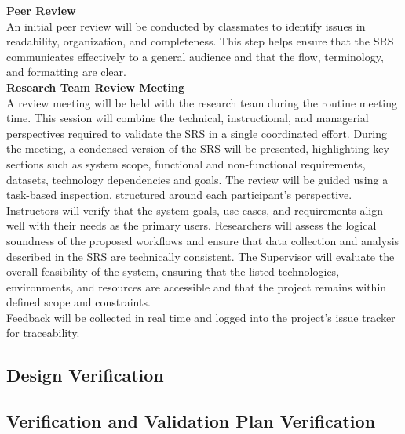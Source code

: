 \documentclass[12pt, titlepage]{article}
\begin{document}
\textbf{Peer Review}\\

An initial peer review will be conducted by classmates to identify issues in readability, organization, and completeness. This step helps ensure that the SRS communicates effectively to a general audience and that the flow, terminology, and formatting are clear.\\

\textbf{Research Team Review Meeting}\\

A review meeting will be held with the research team during the routine meeting time. This session will combine the technical, instructional, and managerial perspectives required to validate the SRS in a single coordinated effort. During the meeting, a condensed version of the SRS will be presented, highlighting key sections such as system scope, functional and non-functional requirements, datasets, technology dependencies and goals. The review will be guided using a task-based inspection, structured around each participant’s perspective.\\

Instructors will verify that the system goals, use cases, and requirements align well with their needs as the primary users. Researchers will assess the logical soundness of the proposed workflows and ensure that data collection and analysis described in the SRS are technically consistent. The Supervisor will evaluate the overall feasibility of the system, ensuring that the listed technologies, environments, and resources are accessible and that the project remains within defined scope and constraints.\\

Feedback will be collected in real time and logged into the project’s issue tracker for traceability.\\

\subsection{Design Verification}




\subsection{Verification and Validation Plan Verification}
\end{document}
